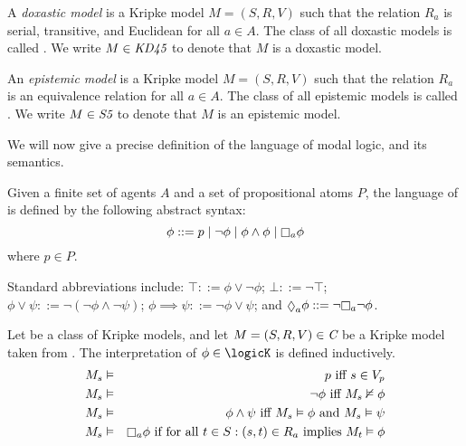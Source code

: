 \begin{definition}
A \textit{doxastic model} is a Kripke model $M = (S, R, V)$ such that the
relation $R_a$ is serial, transitive, and Euclidean for all $a \in A$. The class
of all doxastic models is called \classKD{}. We write $M \in \textit{KD45}{}$ to
denote that $M$ is a doxastic model.
\end{definition}

\begin{definition}
An \textit{epistemic model} is a Kripke model $M = (S, R, V)$ such that the
relation $R_a$ is an equivalence relation for all $a \in A$. The class of all
epistemic models is called \classS{}. We write $M \in \textit{S5}{}$ to denote that
$M$ is an epistemic model.
\end{definition}

We will now give a precise definition of the language of modal logic, and its
semantics.

\begin{definition}
Given a finite set of agents $A$ and a set of propositional atoms $P$, the
language of \langF{} is defined by the following abstract syntax:
$$
\phi ::=    p \bnfalt
            \neg \phi \bnfalt
            \phi \land \phi \bnfalt
            \knows_a \phi
$$
where $p \in P$.
\end{definition}

Standard abbreviations include:
$\top ::= \phi \lor \neg \phi$;
$\bot ::= \neg \top$;
$\phi \lor \psi ::= \neg (\neg \phi \land \neg \psi)$;
$\phi \implies \psi ::= \neg \phi \lor \psi$;
and $\suspects_a \phi ::= \neg \knows_a \neg \phi$.

\begin{definition}
Let \classC{} be a class of Kripke models, and let $M = (S, R, V) \in \textit{C}$
be a Kripke model taken from \classC{}. The interpretation of $\phi \in \logicK$
is defined inductively.
\begin{eqnarray*}
M_s &\entails& p \text{ iff } s \in V_p\\
M_s &\entails& \neg \phi \text{ iff } M_s \nentails \phi\\
M_s &\entails& \phi \land \psi \text{ iff } M_s \entails \phi \text{ and } M_s
\entails \psi\\
M_s &\entails& \knows_a \phi \text{ if for all } t \in S : (s, t) \in R_a \text{
implies } M_t \entails \phi
\end{eqnarray*}
\end{definition}

